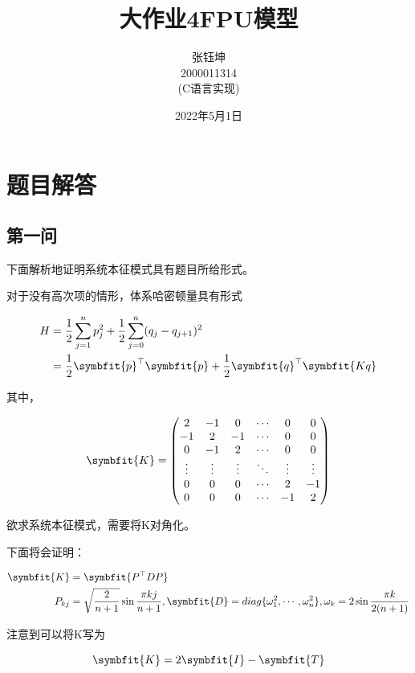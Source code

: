 \documentclass[10pt, a4paper]{article}
\title{\heiti 大作业4\phantom{   }FPU模型}
\author{ 张钰坤 \\  2000011314 \\(C语言实现)}
\date{2022年5月1日}
\newcommand\vbf{\symbfit}
\begin{document}
    \maketitle
    \tableofcontents
    \newpage

    \section{题目解答}

    \subsection{第一问}

    下面解析地证明系统本征模式具有题目所给形式。
    
    对于没有高次项的情形，体系哈密顿量具有形式

    \begin{align}
        H&=\frac{1}{2}\sum_{j=1}^np_j^2+\frac{1}{2}\sum_{j=0}^n(q_j-q_{j+1})^2\\
        &=\frac{1}{2}\vbf{p}^\top \vbf{p}+\frac{1}{2}\vbf{q}^\top \vbf{Kq}
    \end{align}

    其中，

    \begin{align*}
        \vbf{K}=
        \begin{pmatrix}
            2&-1&0&\cdots&0&0\\
            -1&2&-1&\cdots&0&0\\
            0&-1&2&\cdots&0&0\\
            \vdots&\vdots&\vdots&\ddots &\vdots&\vdots\\
            0&0&0&\cdots&2&-1\\
            0&0&0&\cdots&-1&2
        \end{pmatrix}
    \end{align*}

    欲求系统本征模式，需要将K对角化。

    下面将会证明：

    \begin{align}
        \vbf{K}&=\vbf{P^\top D P}\\
        P_{kj}&=\sqrt{\frac{2}{n+1}}\sin{\frac{\pi k j}{n+1}}, \vbf{D}=diag\{\omega_1^2,\cdots,\omega_n^2\},\omega_k=2\sin\frac{\pi k}{2(n+1)}
    \end{align}

    注意到可以将K写为

    \[\vbf{K}=2\vbf{I}-\vbf{T}\]
\end{document}
